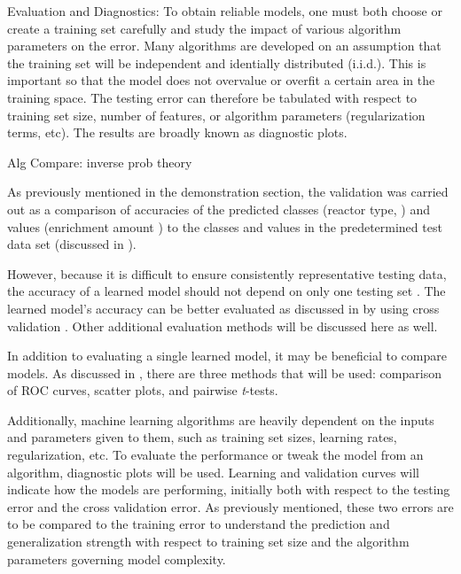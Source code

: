 Evaluation and Diagnostics: To obtain reliable models, one must both choose or create a training set
carefully and study the impact of various algorithm parameters on the error.
Many algorithms are developed on an assumption that the training set will be
independent and identially distributed (i.i.d.). This is important so that the
model does not overvalue or overfit a certain area in the training space. The
testing error can therefore be tabulated with respect to training set size,
number of features, or algorithm parameters (regularization terms, etc). The
results are broadly known as diagnostic plots. 

Alg Compare: inverse prob theory

As previously mentioned in the  demonstration section, the
validation was carried out as a comparison of accuracies of the predicted
classes (reactor type, ) and values
(enrichment amount ) to the classes and values in the
predetermined test data set (discussed in ). 

However, because it is difficult to ensure consistently representative testing
data, the accuracy of a learned model should not depend on only one testing set
. The learned model's accuracy can be
better evaluated as discussed in  by
using cross validation .
Other additional evaluation methods will be discussed here as well.  

In addition to evaluating a single learned model, it may be beneficial to
compare models. As discussed in , there
are three methods that will be used: comparison of \gls{ROC} curves, scatter
plots, and pairwise \textit{t}-tests.

Additionally, machine learning algorithms are heavily dependent on the inputs
and parameters given to them, such as training set sizes, learning rates,
regularization, etc. To evaluate the performance or tweak the model from an
algorithm, diagnostic plots will be used. Learning and validation curves will
indicate how the models are performing, initially both with respect to the
testing error and the cross validation error. As previously mentioned, these
two errors are to be compared to the training error to understand the
prediction and generalization strength with respect to training set size and
the algorithm parameters governing model complexity. 

